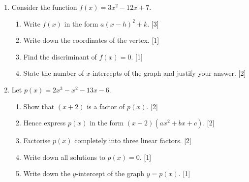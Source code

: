 \documentclass[12pt, twoside]{article}
\begin{document}
\begin{enumerate}[itemsep=0.15cm]

\newpage

\item[3.] [Maximum mark: 7]

Consider the function $f(x) = 3x^2 - 12x + 7$.

\begin{enumerate}[itemsep=0.15cm]
  \item Write $f(x)$ in the form $a(x - h)^2 + k$. \hfill [3]
  \item Write down the coordinates of the vertex. \hfill [1]
  \item Find the discriminant of $f(x) = 0$. \hfill [1]
  \item State the number of $x$-intercepts of the graph
  and justify your answer. \hfill [2]
\end{enumerate}


\newpage

\item[4.] [Maximum mark: 8]

Let $p(x) = 2x^3 - x^2 - 13x - 6$.

\begin{enumerate}[itemsep=0.15cm]
  \item Show that $(x + 2)$ is a factor of $p(x)$. \hfill [2]
  \item Hence express $p(x)$ in the form
  $(x + 2)(ax^2 + bx + c)$. \hfill [2]
  \item Factorise $p(x)$ completely into three
  linear factors. \hfill [2]
  \item Write down all solutions to $p(x) = 0$. \hfill [1]
  \item Write down the $y$-intercept of the graph
  $y = p(x)$. \hfill [1]
\end{enumerate}


\end{enumerate}
\end{document}
